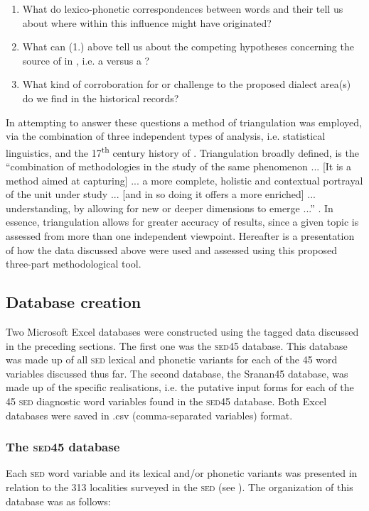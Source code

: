 {{{\begin{enumerate}
\item {What do lexico-phonetic correspondences between  words and their   tell us about where within  this influence might have originated?}
\item{What can (1.) above tell us about the competing hypotheses concerning the source of  in , i.e. a  versus a ?}
\item{What kind of corroboration for or challenge to the proposed dialect area(s) do we find in the historical records?}
\end{enumerate}

In attempting to answer these questions a method of triangulation was employed, via the combination of three independent types of analysis, i.e. statistical linguistics,  and the 17\textsuperscript{th} century history of . Triangulation broadly defined, is the ``combination of methodologies in the study of the same phenomenon ... [It is a method aimed at capturing] ... a more complete, holistic and contextual portrayal of the unit under study ... [and in so doing it offers a more enriched] ... understanding, by allowing for new or deeper dimensions to emerge ...'' \citep[603--604]{Denzin78}. In essence, triangulation allows for greater accuracy of results, since a given topic is assessed from more than one independent viewpoint. Hereafter is a presentation of how the data discussed above were used and assessed using this proposed three-part methodological tool.

\subsection{Database creation}
Two Microsoft Excel databases were constructed using the tagged data discussed in the preceding sections. The first one was the \textsc{sed45} database. This database was made up of all \textsc{sed} lexical and phonetic variants for each of the 45 word variables discussed thus far. The second database, the Sranan45 database, was made up of the specific  realisations, i.e. the putative input forms for each of the 45 \textsc{sed} diagnostic word variables found in the \textsc{sed45} database. Both Excel databases were saved in .csv (comma-separated variables) format.

\subsubsection{The \textsc{sed45} database}
Each \textsc{sed} word variable and its lexical and/or phonetic variants was presented in relation to the 313 localities surveyed in the \textsc{sed} (see ). The organization of this database was as follows:

}}}
